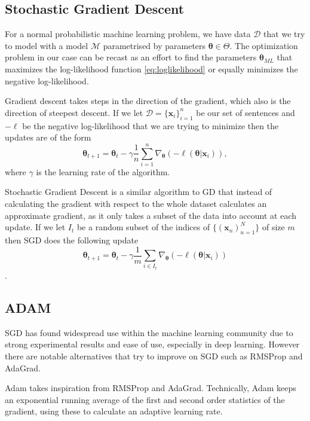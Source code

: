 \subsection{Stochastic Gradient Descent}

For a normal probabilistic machine learning problem, we have data $\mathcal{D}$
that we try to model with a model $\mathcal{M}$ parametrised by parameters
$\bm{\theta} \in \Theta$. The optimization problem in our case can be recast
as an effort to find the parameters $\bm{\theta}_{ML}$ that maximizes the
log-likelihood function \eqref{eq:loglikelihood} or equally minimizes the
negative log-likelihood.

Gradient descent takes steps in the direction of the gradient, which also is the
direction of steepest descent. If we let $\mathcal{D} = \{\bm{x}_i\}_{i = 1}^n$
be our set of sentences and $-\ell$ be the negative log-likelihood that we are
trying to minimize then the updates are of the form
\begin{equation}
  \label{eq:GD_update}
  \bm{\theta}_{t + 1} = \bm{\theta}_t - \gamma \frac{1}{n} \sum_{i = 1}^n \nabla_{\bm{\theta}} (-\ell(\bm{\theta}| \bm{x}_i)),
\end{equation}
where $\gamma$ is the learning rate of the algorithm.

Stochastic Gradient Descent is a similar algorithm to GD that instead of
calculating the gradient with respect to the whole dataset calculates an
approximate gradient, as it only takes a subset of the data into account at each
update. If we let $I_t$ be a random subset of the indices of $\{(\bm{x}_n)_{n=1}^N\}$ of size $m$ then SGD does the following update
\begin{equation}
  \label{eq:SGD_update}
  \bm{\theta}_{t + 1} = \bm{\theta}_t - \gamma \frac{1}{m} \sum_{i \in I_t} \nabla_{\bm{\theta}} (-\ell(\bm{\theta}| \bm{x}_i))
\end{equation}\cite{series/lncs/Bottou12}\cite[p.~240]{Bishop:2006}.

\subsection{ADAM}
SGD has found widespread use within the machine learning community due to strong
experimental results and ease of use, especially in deep learning. However there
are notable alternatives that try to improve on SGD such as
RMSProp\cite{Tieleman2012} and AdaGrad\cite{Duchi:EECS-2010-24}.

Adam takes inspiration from RMSProp and AdaGrad. Technically, Adam keeps an
exponential running average of the first and second order statistics of the
gradient, using these to calculate an adaptive learning rate.

